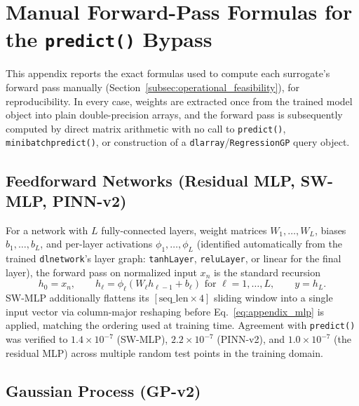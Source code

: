 
\section{Manual Forward-Pass Formulas for the \texttt{predict()} Bypass}
\label{sec:appendix}

This appendix reports the exact formulas used to compute each
surrogate's forward pass manually (Section~\ref{subsec:operational_feasibility}),
for reproducibility. In every case, weights are extracted once from
the trained model object into plain double-precision arrays, and the
forward pass is subsequently computed by direct matrix arithmetic with
no call to \texttt{predict()}, \texttt{minibatchpredict()}, or
construction of a \texttt{dlarray}/\texttt{RegressionGP} query object.

\subsection{Feedforward Networks (Residual MLP, SW-MLP, PINN-v2)}
\label{subsec:appendix_mlp}

For a network with $L$ fully-connected layers, weight matrices
$W_1,\ldots,W_L$, biases $b_1,\ldots,b_L$, and per-layer activations
$\phi_1,\ldots,\phi_L$ (identified automatically from the trained
\texttt{dlnetwork}'s layer graph: \texttt{tanhLayer},
\texttt{reluLayer}, or linear for the final layer), the forward pass on
normalized input $x_n$ is the standard recursion
\begin{equation}
h_0 = x_n, \qquad h_\ell = \phi_\ell\!\left(W_\ell h_{\ell-1} + b_\ell\right)
\text{ for } \ell=1,\ldots,L, \qquad y = h_L.
\label{eq:appendix_mlp}
\end{equation}
SW-MLP additionally flattens its $[\text{seq\_len}\times 4]$ sliding
window into a single input vector via column-major reshaping before
Eq.~\eqref{eq:appendix_mlp} is applied, matching the ordering used at
training time. Agreement with \texttt{predict()} was verified to
$1.4\times10^{-7}$ (SW-MLP), $2.2\times10^{-7}$ (PINN-v2), and
$1.0\times10^{-7}$ (the residual MLP) across multiple random test
points in the training domain.

\subsection{Gaussian Process (GP-v2)}
\label{subsec:appendix_gp}

